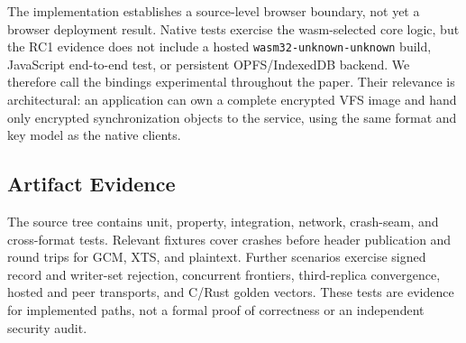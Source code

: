 The implementation establishes a source-level browser boundary, not yet a
browser deployment result.  Native tests exercise the wasm-selected core logic,
but the RC1 evidence does not include a hosted \texttt{wasm32-unknown-unknown}
build, JavaScript end-to-end test, or persistent OPFS/IndexedDB backend.  We
therefore call the bindings experimental throughout the paper.  Their relevance
is architectural: an application can own a complete encrypted VFS image and
hand only encrypted synchronization objects to the service, using the same
format and key model as the native clients.

\subsection{Artifact Evidence}

The source tree contains unit, property, integration, network, crash-seam, and
cross-format tests.  Relevant fixtures cover crashes before header publication
and round trips for GCM, XTS, and plaintext.  Further scenarios exercise signed
record and writer-set rejection, concurrent frontiers, third-replica
convergence, hosted and peer transports, and C/Rust golden vectors.  These tests
are evidence for implemented paths, not a formal proof of correctness or an
independent security audit.
